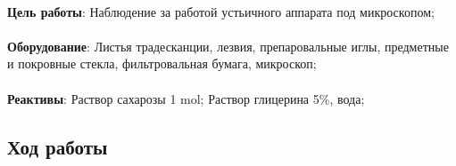 


\begin{footnotesize}

\paragraph*{}\textbf{Цель работы}: Наблюдение за работой устьичного аппарата под микроскопом;

\paragraph*{}\textbf{Оборудование}: Листья традесканции, лезвия, препаровальные иглы, предметные и покровные стекла, фильтровальная бумага, микроскоп;

\paragraph*{}\textbf{Реактивы}: Раствор сахарозы 1 \gls{mol}; Раствор глицерина 5\%, вода;

\end{footnotesize}

\subsection*{Ход работы}

